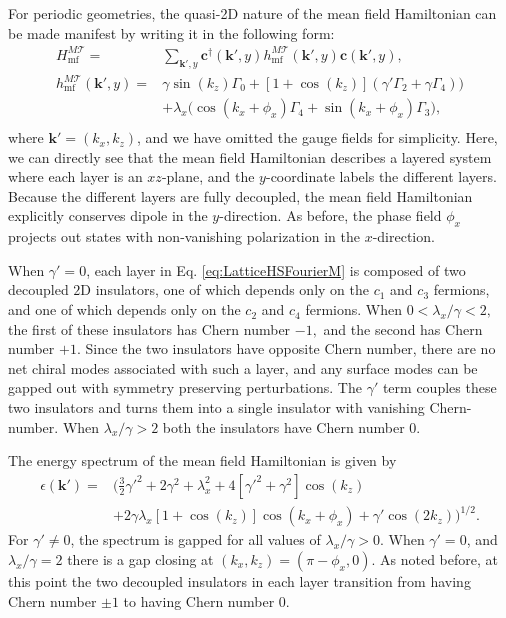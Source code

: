 \documentclass[prb,aps,twocolumn,groupaddress,floatfix]{revtex4-1}
\begin{document}
For periodic geometries, the quasi-2D nature of the mean field Hamiltonian can be made manifest by writing it in the following form:
\begin{equation}
\begin{split}
H^{M\mathcal{T}}_{\text{mf}} =& \sum_{\bm{k}',y}  \bm{c}^\dagger(\bm{k}',y) h^{M\mathcal{T}}_{\text{mf}}(\bm{k}',y) \bm{c}(\bm{k}',y),  \\
h^{M\mathcal{T}}_{\text{mf}}(\bm{k}',y) =&\gamma \sin(k_z )\Gamma_0 +[1+\cos(k_z )](\gamma'\Gamma_2+\gamma \Gamma_4) \big)\\
&+ \lambda_x \big(\cos(k_x+\phi_{x})\Gamma_4 + \sin(k_x + \phi_{x}) \Gamma_3\big),\\
\end{split}\label{eq:LatticeHSFourierM}
\end{equation}
where $\bm{k}' = (k_x,k_z)$, and we have omitted the gauge fields for simplicity. Here, we can directly see that the mean field Hamiltonian describes a layered system where each layer is an $xz$-plane, and the $y$-coordinate labels the different layers. Because the different layers are fully decoupled, the mean field Hamiltonian explicitly conserves dipole in the $y$-direction. As before, the phase field $\phi_x$ projects out states with non-vanishing polarization in the $x$-direction. 

When $\gamma' = 0$, each layer in Eq. \ref{eq:LatticeHSFourierM} is composed of two decoupled $2$D insulators, one of which  depends only on the $c_1$ and $c_3$ fermions, and one of which depends only on the $c_2$ and $c_4$ fermions. When $0< \lambda_x/\gamma < 2,$ the first of these insulators has Chern number $-1,$ and the second has Chern number $+1$. Since the two insulators have opposite Chern number, there are no net chiral modes associated with such a layer, and any surface modes can be gapped out with symmetry preserving perturbations. The $\gamma'$ term couples these two insulators and turns them into a single insulator with vanishing Chern-number.   When $\lambda_x/\gamma > 2$ both the insulators have Chern number 0. 

The energy spectrum of the mean field Hamiltonian is given by 
\begin{equation}
\begin{split}
\epsilon(\bm{k}') = &\Big(\frac{3}{2}\gamma'^2 + 2\gamma^2 + \lambda_x^2+4[\gamma'^2 + \gamma^2 ]\cos(k_z)  \\
&+2\gamma\lambda_x [1+\cos(k_z)] \cos(k_x+\phi_x)+ \gamma'\cos(2k_z)\Big)^{1/2}.
\end{split}\label{eq:MeanFieldEnergyM}
\end{equation} 
For $\gamma' \neq 0$, the spectrum is gapped for all values of $\lambda_x/\gamma >0$. When $\gamma' = 0$, and $\lambda_x/\gamma = 2$ there is a gap closing at $(k_x,k_z) = (\pi-\phi_x,0)$. As noted before, at this point the two decoupled insulators in each layer transition from having Chern number $\pm1$ to having Chern number 0. 
\end{document}
